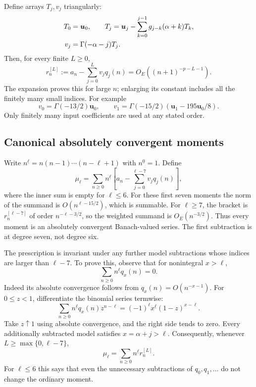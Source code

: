 \documentclass[11pt,letterpaper]{article}
\theoremstyle{remark}\newtheorem{remark}[theorem]{Remark}
\numberwithin{equation}{section}
\newcommand{\fall}[2]{#1^{\underline{#2}}}
\newcommand{\bfU}{\boldsymbol u}
\begin{document}
Define arrays $T_j,v_j$ triangularly:
\begin{align}\label{upo:all5:eq:matching}
 T_0&=\bfU_0,\qquad
 T_j=\bfU_j-\sum_{k=0}^{j-1}g_{j-k}(\alpha+k)T_k,\notag\\
 v_j&=\Gamma(-\alpha-j)T_j.
\end{align}
Then, for every finite $L\ge0$,
\begin{equation}\label{upo:all5:eq:remainder}
 r_n^{[L]}:=a_n-\sum_{j=0}^Lv_jq_j(n)
                  =O_E((n+1)^{-p-L-1}).
\end{equation}
The expansion proves this for large $n$; enlarging its constant
includes all the finitely many small indices. For example
\[
 v_0=\Gamma(-13/2)\bfU_0,\qquad
 v_1=\Gamma(-15/2)(\bfU_1-195\bfU_0/8).
\]
Only finitely many input coefficients are used at any stated order.

\subsection{Canonical absolutely convergent moments}\label{upo:all5:sec:moments}
Write $\fall n\ell=n(n-1)\cdots(n-\ell+1)$ with
$\fall n0=1$. Define
\begin{equation}\label{upo:all5:eq:mu}
 \mu_\ell=\sum_{n\ge0}\fall n\ell
       \left[a_n-\sum_{j=0}^{\ell-7}v_jq_j(n)\right],
\end{equation}
where the inner sum is empty for $\ell\le6$. For these first seven
moments the norm of the summand is $O(n^{\ell-15/2})$, which is
summable. For $\ell\ge7$, the bracket is $r_n^{[\ell-7]}$ of order
$n^{-\ell-3/2}$, so the weighted summand is $O_E(n^{-3/2})$.
Thus every moment is an absolutely convergent Banach-valued series.
The first subtraction is at degree seven, not degree six.

The prescription is invariant under any further model subtractions
whose indices are larger than $\ell-7$. To prove this, observe that
for nonintegral $x>\ell$,
\begin{equation}\label{upo:all5:eq:zero-moment}
 \sum_{n\ge0}\fall n\ell q_x(n)=0.
\end{equation}
Indeed its absolute convergence follows from
$q_x(n)=O(n^{-x-1})$. For $0\le z<1$, differentiate the binomial
series termwise:
\[
 \sum_{n\ge0}\fall n\ell q_x(n)z^{n-\ell}
       =(-1)^\ell\fall x\ell(1-z)^{x-\ell}.
\]
Take $z\uparrow1$ using absolute convergence, and the right side
tends to zero. Every additionally subtracted model satisfies
$x=\alpha+j>\ell$. Consequently, whenever
$L\ge\max\{0,\ell-7\}$,
\begin{equation}\label{upo:all5:eq:mu-common}
 \mu_\ell=\sum_{n\ge0}\fall n\ell r_n^{[L]}.
\end{equation}
For $\ell\le6$ this says that even the unnecessary subtractions of
$q_0,q_1,\ldots$ do not change the ordinary moment.
\end{document}
